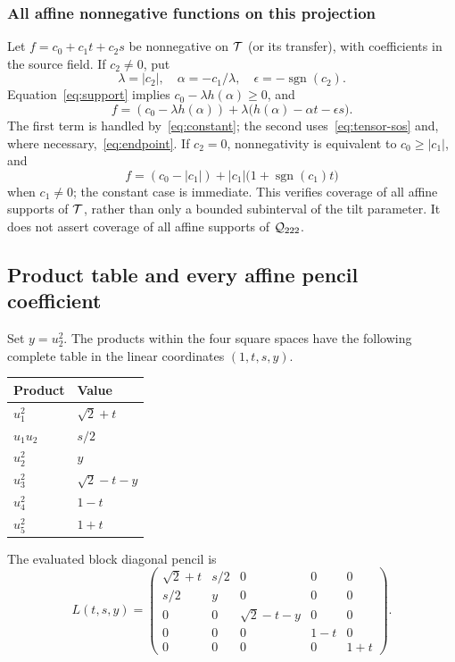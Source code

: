 \subsubsection{All affine nonnegative functions on this projection}
Let $f=c_0+c_1t+c_2s$ be nonnegative on $\mathcal T$ (or its transfer), with coefficients in the source field. If $c_2\ne0$, put
\[
 \lambda=|c_2|,\quad \alpha=-c_1/\lambda,
 \quad\epsilon=-\operatorname{sgn}(c_2).
\]
Equation~\eqref{eq:support} implies $c_0-\lambda h(\alpha)\ge0$, and
\[
 f=(c_0-\lambda h(\alpha))
       +\lambda\bigl(h(\alpha)-\alpha t-\epsilon s\bigr).
\]
The first term is handled by~\eqref{eq:constant}; the second uses~\eqref{eq:tensor-sos} and, where necessary,~\eqref{eq:endpoint}. If $c_2=0$, nonnegativity is equivalent to $c_0\ge|c_1|$, and
\[
 f=(c_0-|c_1|)+|c_1|\bigl(1+\operatorname{sgn}(c_1)t\bigr)
\]
when $c_1\ne0$; the constant case is immediate. This verifies coverage of all affine supports of $\mathcal T$, rather than only a bounded subinterval of the tilt parameter. It does not assert coverage of all affine supports of ${\mathcal Q_{222}}$.

\subsection{Product table and every affine pencil coefficient}
Set $y=u_2^2$. The products within the four square spaces have the following complete table in the linear coordinates $(1,t,s,y)$.
\begin{center}
\begin{tabular}{ll}
\toprule
Product&Value\\\midrule
$u_1^2$&$\sqrt2+t$\\
$u_1u_2$&$s/2$\\
$u_2^2$&$y$\\
$u_3^2$&$\sqrt2-t-y$\\
$u_4^2$&$1-t$\\
$u_5^2$&$1+t$\\\bottomrule
\end{tabular}
\end{center}
The evaluated block diagonal pencil is
\begin{equation}\label{eq:lift}
 L(t,s,y)=
 \begin{pmatrix}
 \sqrt2+t&s/2&0&0&0\\
 s/2&y&0&0&0\\
 0&0&\sqrt2-t-y&0&0\\
 0&0&0&1-t&0\\
 0&0&0&0&1+t
 \end{pmatrix}.
\end{equation}

